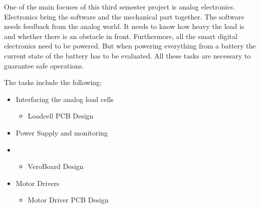 \documentclass[../report.tex]{subfiles}
\begin{document}
One of the main focuses of this third semester project is analog electronics. Electronics bring the software and the mechanical part together. 
The software needs feedback from the analog world. It needs to know how heavy the load is and
whether there is an obstacle in front. Furthermore, all the smart digital electronics need to be powered. 
But when powering everything from a battery the current state of the battery has to be evaluated.
All these tasks are necessary to guarantee safe operations.

\quad
The tasks include the following:

\begin{itemize}
    \item Interfacing the analog load cells
    \begin{itemize}
      \item Loadcell PCB Design
    \end{itemize} 
    \item Power Supply and monitoring
    \item \begin{itemize}
      \item VeroBoard Design
    \end{itemize}
    \item Motor Drivers
    \begin{itemize}
      \item Motor Driver PCB Design
    \end{itemize}  
\end{itemize}
  
\end{document}
